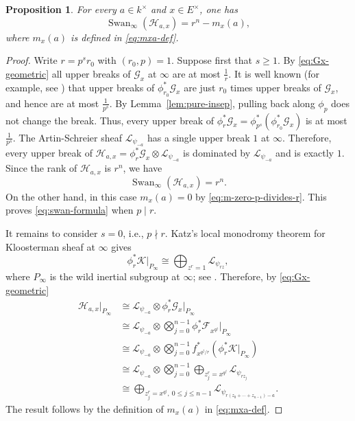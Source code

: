 \documentclass[11pt]{amsart}
\newtheorem{proposition}[theorem]{Proposition}
\theoremstyle{remark}
\newcommand{\Swan}{\operatorname{Swan}}
\newcommand{\cF}{\mathcal F}
\newcommand{\cK}{\mathcal K}
\newcommand{\cL}{\mathcal L}
\newcommand{\cG}{\mathcal G}
\newcommand{\cH}{\mathcal H}
\begin{document}
\begin{proposition}\label{prop:swan}
For every $a\in k^{\times}$ and $x\in E^{\times}$, one has
\begin{equation}\label{eq:swan-formula}
    \Swan_\infty(\cH_{a,x})=r^n-m_x(a),
\end{equation}
where $m_x(a)$ is defined in \eqref{eq:mxa-def}.
\end{proposition}

\begin{proof}
Write $r=p^s r_0$ with $(r_0,p)=1$. Suppose first that $s\ge 1$. By \eqref{eq:Gx-geometric} all upper breaks of $\cG_x$ at $\infty$ are at most $\frac{1}{r}$. It is well known (for example, see \cite[1.13.1]{KatzGKM}) that upper breaks of $\phi_{r_0}^*\cG_x$ are just $r_0$ times upper breaks of $\cG_x$, and hence are at most $\frac{1}{p^s}$. By Lemma~\ref{lem:pure-insep}, pulling back along $\phi_p$ does not change the break. Thus, every upper break of $\phi_{r}^*\cG_x=\phi_{p^s}^*(\phi_{r_0}^*\cG_x)$ is at most $\frac{1}{p^s}$. The Artin-Schreier sheaf $\cL_{\psi_{-a}}$ has a single upper break $1$ at $\infty$. Therefore, every upper break of
$\cH_{a,x}=\phi_{r}^*\cG_x\otimes\cL_{\psi_{-a}}$ is dominated by $\cL_{\psi_{-a}}$ and is exactly $1$. Since the rank of $\cH_{a,x}$ is $r^n$, we have
\[
        \Swan_\infty(\cH_{a,x})=r^n.
\]
On the other hand, in this case $m_x(a)=0$ by \eqref{eq:m-zero-p-divides-r}. This proves \eqref{eq:swan-formula} when
$p\mid r$.

It remains to consider $s=0$, i.e., $p\nmid r$. Katz's local monodromy theorem for Kloosterman
sheaf at $\infty$ gives 
\begin{equation}\label{eq:Katz-local-infty}
    \phi_{r}^*\cK|_{P_\infty}\cong\bigoplus_{z^r=1}\cL_{\psi_{rz}},
\end{equation}
where $P_\infty$ is the wild inertial subgroup at $\infty$; see \cite[Remark~10.4.5]{KatzGKM}. Therefore, by \eqref{eq:Gx-geometric}
\[
\begin{aligned}
\cH_{a,x}|_{P_\infty}&\cong\cL_{\psi_{-a}}\otimes\phi_{r}^*\cG_x|_{P_\infty}\\
&\cong\cL_{\psi_{-a}}\otimes\bigotimes_{j=0}^{n-1}\phi_{r}^*\cF_{x^{q^j}}|_{P_\infty}\\
&\cong\cL_{\psi_{-a}}\otimes\bigotimes_{j=0}^{n-1}f_{x^{q^j/r}}^*(\phi_{r}^*\cK|_{P_\infty})\\
&\cong\cL_{\psi_{-a}}\otimes\bigotimes_{j=0}^{n-1}\bigoplus_{z_{j}^r=x^{q^j}}\cL_{\psi_{rz_j}}\\
&\cong\bigoplus_{z_j^r=x^{q^j},~0\le j\le n-1}\cL_{\psi_{r(z_0+\cdots+z_{n-1})-a}}.
\end{aligned}
\]
The result follows by the definition of $m_x(a)$ in \eqref{eq:mxa-def}.
\end{proof}
\end{document}
